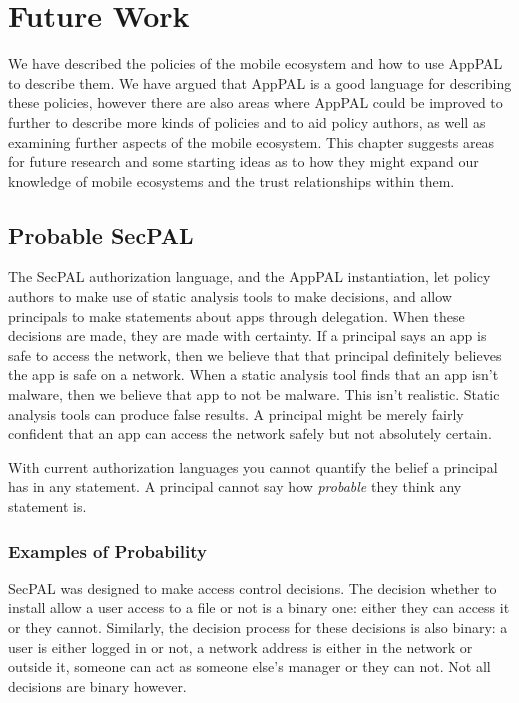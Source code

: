 \documentclass[thesis.tex]{subfiles}
\begin{document}
\chapter{Future Work}
\label{chap:future-work}

We have described the policies of the mobile ecosystem and how to use
AppPAL to describe them. We have argued that AppPAL is a good language
for describing these policies, however there are also areas where
AppPAL could be improved to further to describe more kinds of policies
and to aid policy authors, as well as examining further aspects of the
mobile ecosystem. This chapter suggests areas for future research and
some starting ideas as to how they might expand our knowledge of
mobile ecosystems and the trust relationships within them.

\section{Probable SecPAL}

The SecPAL authorization language, and the AppPAL instantiation, let policy
authors to make use of static analysis tools to make decisions, and allow
principals to make statements about apps through delegation. When these
decisions are made, they are made with certainty. If a principal says an app is
safe to access the network, then we believe that that principal definitely
believes the app is safe on a network. When a static analysis tool finds that an
app isn't malware, then we believe that app to not be malware. This isn't
realistic. Static analysis tools can produce false results. A principal might be
merely fairly confident that an app can access the network safely but not
absolutely certain.

With current authorization languages you cannot quantify the belief a principal
has in any statement. A principal cannot say how \emph{probable} they think any
statement is.

\subsection{Examples of Probability}

SecPAL was designed to make access control decisions. The decision whether to
install allow a user access to a file or not is a binary one: either they can
access it or they cannot. Similarly, the decision process for these decisions is
also binary: a user is either logged in or not, a network address is either in
the network or outside it, someone can act as someone else's manager or they can
not. Not all decisions are binary however.
\end{document}
